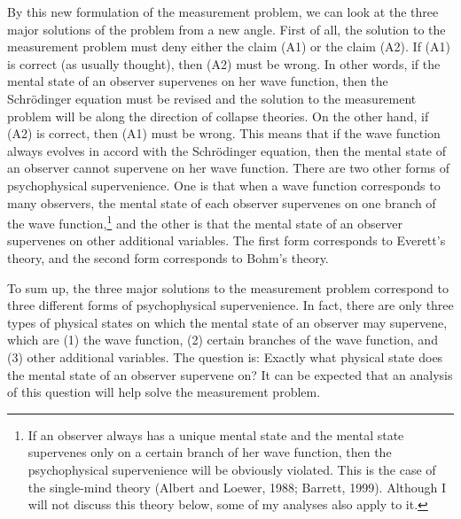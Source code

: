 By this new formulation of the measurement problem, we can look at the three major solutions of the problem from a new angle.
First of all, the solution to the measurement problem must deny either the claim (A1) or the claim (A2).
If (A1) is correct (as usually thought), then (A2) must be wrong. In other words, if the mental state of an observer supervenes on her wave function, then the Schr\"{o}dinger equation must be revised and the solution to the  measurement problem will be along the direction of collapse theories.
On the other hand,  if (A2) is correct, then (A1) must be wrong. This means that if the wave function always evolves in accord with the Schr\"{o}dinger equation, then the mental state of an observer cannot supervene on her wave function.
There are two other forms of psychophysical supervenience.
One is that when a wave function corresponds to many observers, the mental state of each observer supervenes on one branch of the wave function,\footnote{If an observer always has a unique mental state and the mental state supervenes only on a certain branch of her wave function, then the psychophysical supervenience will be obviously violated. This is the case of the single-mind theory (Albert and Loewer, 1988; Barrett, 1999). Although I will not discuss this theory below, some of my analyses also apply to it.} and the other is that  the mental state of an observer supervenes on other additional variables. %
The first form corresponds to Everett's theory, and the second form corresponds to Bohm's theory.

To sum up,  the three major solutions to the measurement problem correspond to three different forms of psychophysical supervenience. 
In fact, there are only three types of physical states on which the mental state of an observer may supervene, which are (1) the wave function, (2) certain branches of the wave function, and (3) other additional variables.
The question is: Exactly what physical state does the mental state of an observer supervene on?
It can be expected that an analysis of this question will help solve the measurement problem.

